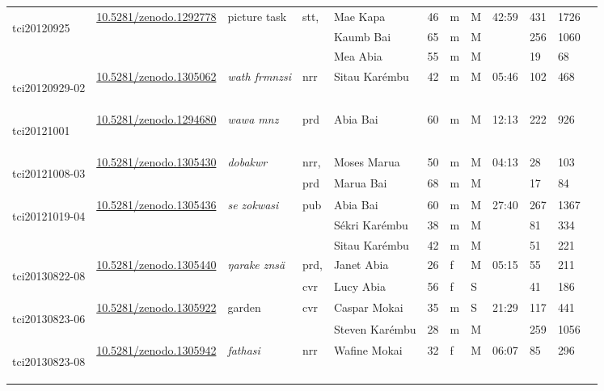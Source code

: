 \begin{landscape}
{\begin{longtable}{p{}lllllllllll}
	\multirow{3}{*}{\hypertarget{tci20120925}{tci20120925}}&\multirow{3}{*}{\href{https://zenodo.org/record/1292778}{10.5281/zenodo.1292778}}& \multirow{3}{*}{picture task} & \multirow{2}{*}{stt,} & Mae Kapa & 46 & m & M & \multirow{3}{*}{42:59} & 431&1726\\
	&&&\multirow{2}{*}{cvr}& Kaumb Bai & 65 & m & M && 256&1060\\
	&&&& Mea Abia & 55 & m & M && 19&68\\\hline
	\hypertarget{tci20120929-02}{tci20120929-02} &\href{https://zenodo.org/record/1305062}{10.5281/zenodo.1305062}& \emph{wath frmnzsi} & nrr & Sitau Karémbu & 42 & m & M & 05:46 & 102&468\\\hline
	\hypertarget{tci20121001}{tci20121001} 	&\href{https://zenodo.org/record/1294680}{10.5281/zenodo.1294680}& \emph{wawa mnz} & prd & Abia Bai & 60 & m & M & 12:13 & 222&926\\\hline
	\multirow{2}{*}{\hypertarget{tci20121008-03}{tci20121008-03}} &\multirow{2}{*}{\href{https://zenodo.org/record/1305430}{10.5281/zenodo.1305430}}& \multirow{2}{*}{\emph{dobakwr}} & nrr, & Moses Marua & 50 & m & M & \multirow{2}{*}{04:13} & 28&103\\
	&&&prd&Marua Bai & 68 & m &M &  & 17&84\\\hline
	\multirow{3}{*}{\hypertarget{tci20121019-04}{tci20121019-04}} &\multirow{3}{*}{\href{https://zenodo.org/record/1305436}{10.5281/zenodo.1305436}}& \multirow{3}{*}{\emph{se zokwasi}} & \multirow{3}{*}{pub} & Abia Bai & 60 & m & M & \multirow{3}{*}{27:40} & 267&1367\\
	&&&& Sékri Karémbu & 38 & m & M && 81&334\\
	&&&& Sitau Karémbu & 42 & m & M && 51&221\\\hline
	\multirow{2}{*}{\hypertarget{tci20130822-08}{tci20130822-08}} &\multirow{2}{*}{\href{https://zenodo.org/record/1305440}{10.5281/zenodo.1305440}}& \multirow{2}{*}{\emph{ŋarake znsä}} & prd, & Janet Abia & 26 & f & M & \multirow{2}{*}{05:15} & 55&211\\
	&&&cvr& Lucy Abia & 56 & f & S && 41&186\\\hline
	\multirow{2}{*}{\hypertarget{tci20130823-06}{tci20130823-06}} &\multirow{2}{*}{\href{https://zenodo.org/record/1305922}{10.5281/zenodo.1305922}}& \multirow{2}{*}{garden} & \multirow{2}{*}{cvr} & Caspar Mokai & 35 & m & S & \multirow{2}{*}{21:29} & 117&441\\
	&&&&Steven Karémbu & 28 & m & M & &259&1056\\\hline
	\hypertarget{tci20130823-08}{tci20130823-08} &\href{https://zenodo.org/record/1305942}{10.5281/zenodo.1305942}& \emph{fathasi} & nrr & Wafine Mokai & 32 & f & M & 06:07 & 85&296\\\hline

\end{longtable}}
\end{landscape}
